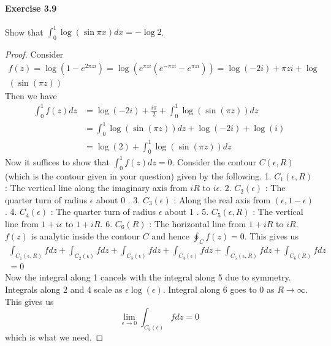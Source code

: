 \documentclass{article}
\begin{document}
\paragraph{Exercise 3.9} Show that $\int_0^1 \log(\sin \pi x) dx = - \log 2$.
\begin{proof}
Consider
$$
\begin{gathered}
f(z)=\log \left(1-e^{2 \pi z i}\right)=\log \left(e^{\pi z i}\left(e^{-\pi z i}-e^{\pi z i}\right)\right)=\log (-2 i)+\pi z i+\log \\
(\sin (\pi z))
\end{gathered}
$$
Then we have
$$
\begin{aligned}
\int_0^1 f(z) d z & =\log (-2 i)+\frac{i \pi}{2}+\int_0^1 \log (\sin (\pi z)) d z \\
& =\int_0^1 \log (\sin (\pi z)) d z+\log (-2 i)+\log (i) \\
& =\log (2)+\int_0^1 \log (\sin (\pi z)) d z
\end{aligned}
$$
Now it suffices to show that $\int_0^1 f(z) d z=0$. Consider the contour $C(\epsilon, R)$ (which is the contour given in your question) given by the following.
1. $C_1(\epsilon, R)$ : The vertical line along the imaginary axis from $i R$ to $i \epsilon$.
2. $C_2(\epsilon)$ : The quarter turn of radius $\epsilon$ about 0 .
3. $C_3(\epsilon)$ : Along the real axis from $(\epsilon, 1-\epsilon)$.
4. $C_4(\epsilon)$ : The quarter turn of radius $\epsilon$ about 1 .
5. $C_5(\epsilon, R)$ : The vertical line from $1+i \epsilon$ to $1+i R$.
6. $C_6(R)$ : The horizontal line from $1+i R$ to $i R$.
$f(z)$ is analytic inside the contour $C$ and hence $\oint_C f(z)=0$. This gives us
$$
\begin{aligned}
\int_{C_1(\epsilon, R)} f d z+\int_{C_2(\epsilon)} f d z+\int_{C_3(\epsilon)} f d z+\int_{C_4(\epsilon)} f d z+\int_{C_5(\epsilon, R)} f d z+\int_{C_6(R)} f d z \\
=0
\end{aligned}
$$
Now the integral along 1 cancels with the integral along 5 due to symmetry. Integrals along 2 and 4 scale as $\epsilon \log (\epsilon)$. Integral along 6 goes to 0 as $R \rightarrow \infty$. This gives us
$$
\lim _{\epsilon \rightarrow 0} \int_{C_3(\epsilon)} f d z=0
$$
which is what we need.
\end{proof}
\end{document}
